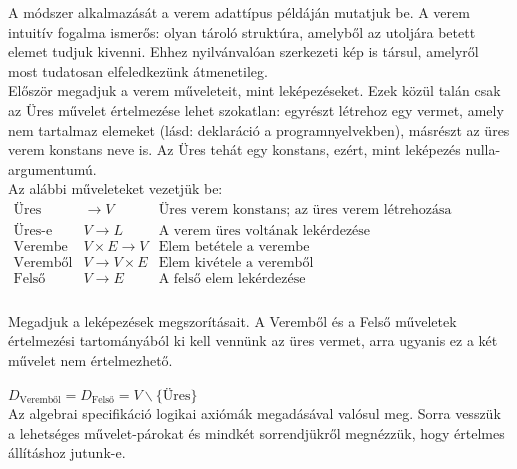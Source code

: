 \documentclass[12pt,margin=0px]{article}
\begin{document}
    {\footnotesize \noindent {\color{blue} \faLightbulbO\ $\triangleright$ } }

    {\footnotesize
    \noindent A módszer alkalmazását a verem adattípus példáján mutatjuk be. A verem intuitív fogalma ismerős: olyan tároló struktúra, amelyből az utoljára betett elemet tudjuk kivenni. Ehhez nyilvánvalóan szerkezeti kép is társul, amelyről most tudatosan elfeledkezünk átmenetileg.\\

    \noindent Először megadjuk a verem műveleteit, mint leképezéseket. Ezek közül talán csak az Üres művelet értelmezése lehet szokatlan: egyrészt létrehoz egy vermet, amely nem tartalmaz elemeket (lásd: deklaráció a programnyelvekben), másrészt az üres verem konstans neve is. Az Üres tehát egy konstans, ezért, mint leképezés nulla-argumentumú.\\

    \noindent Az alábbi műveleteket vezetjük be:\\

    $\begin{array}{l|l|l}
        \text{Üres} & \rightarrow V & \text{Üres verem konstans; az üres verem létrehozása} \\
        \text{Üres-e} & V \rightarrow L & \text{A verem üres voltának lekérdezése} \\
        \text{Verembe} & V \times E \rightarrow V & \text{Elem betétele a verembe} \\
        \text{Veremből} & V \rightarrow V \times E & \text{Elem kivétele a veremből} \\
        \text{Felső} & V \rightarrow E & \text{A felső elem lekérdezése} \\
      \end{array}$\\\\

    \noindent Megadjuk a leképezések megszorításait. A Veremből és a Felső műveletek értelmezési tartományából ki kell vennünk az üres vermet, arra ugyanis ez a két művelet nem értelmezhető.

    $D_{\text{Veremből}}=D_{\text{Felső}}=V \backslash \{\text{Üres}\}$\\

    \noindent Az algebrai specifikáció logikai axiómák megadásával valósul meg. Sorra vesszük a lehetséges művelet-párokat és mindkét sorrendjükről megnézzük, hogy értelmes állításhoz jutunk-e.}\\
    \newpage
\end{document}
